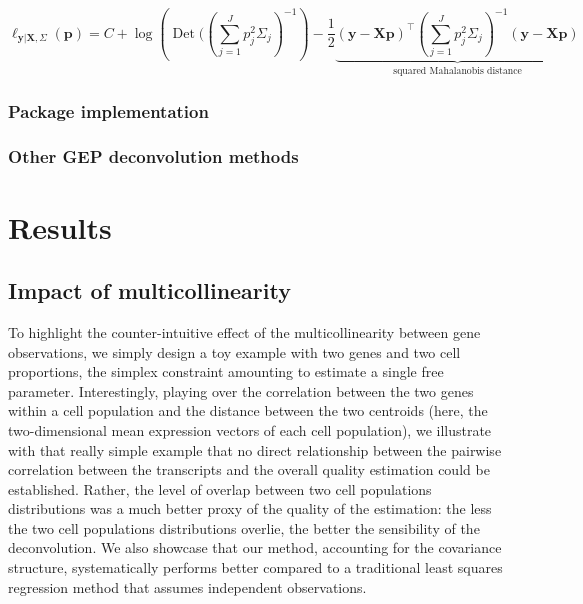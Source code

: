 \documentclass[long, final]{jobim}
\DeclareMathOperator*{\DET}{Det}
\begin{document}
\begin{equation}
\ell_{\boldsymbol{y} | \boldsymbol{X}, \Sigma}(\boldsymbol{p})=C + \log\left(\DET(\left(\sum_{j=1}^J p_{j}^2\Sigma_{j}\right)^{-1}\right) - \frac{1}{2} \underbrace{(\boldsymbol{y} - \boldsymbol{X} \boldsymbol{p})^\top \left(\sum_{j=1}^J p_{j}^2\Sigma_{j}\right)^{-1} (\boldsymbol{y} - \boldsymbol{X}\boldsymbol{p})}_{\text{squared Mahalanobis distance}}   
\end{equation}




\subsubsection{Package implementation}
\label{subsubsec:implementation}

\subsubsection{Other GEP deconvolution methods}
\label{subsubsec:other-deconv-methods}

\section{Results}
\label{sec:results}

\subsection{Impact of multicollinearity}
\label{subsec:multicollinearity}

To highlight the counter-intuitive effect of the multicollinearity between gene observations, we simply design a toy example with two genes and two cell proportions, the simplex constraint amounting to estimate a single free parameter. Interestingly, playing over the correlation between the two genes within a cell population and the distance between the two centroids (here, the two-dimensional mean expression vectors of each cell population), we illustrate with that really simple example that no direct relationship between the pairwise correlation between the transcripts and the overall quality estimation could be established. Rather, the level of overlap between two cell populations distributions was a much better proxy of the quality of the estimation: the less the two cell populations distributions overlie, the better the sensibility of the deconvolution. We also showcase that our method, accounting for the covariance structure, systematically performs better compared to a traditional least squares regression method that assumes independent observations. 
\end{document}
